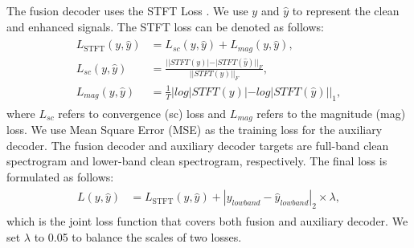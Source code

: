 The fusion decoder uses the STFT Loss \citep{defossez2020real}. We use $y$ and $\hat{y}$ to represent the clean and enhanced signals. The STFT loss can be denoted as follows: 
\begin{align} 
\label{math:stft_loss}
\begin{split}
    L_{\mathrm{STFT}}(y, \hat{y}) &= L_{sc}(y, \hat{y}) + L_{mag}(y, \hat{y}),
    \\
    L_{sc}(y, \hat{y}) &= \frac{||STFT(y)| - |STFT(\hat{y})||_{F}}{||STFT(y)||_{F}},
    \\
    L_{mag}(y, \hat{y}) &= \frac{1}{T}|log|STFT(y)| - log|STFT(\hat{y})||_{1},
\end{split}
\end{align} 
where $L_{sc}$ refers to convergence
(sc) loss and $L_{mag}$ refers to the magnitude (mag) loss.
We use Mean Square Error (MSE) as the training loss for the auxiliary decoder. The fusion decoder and auxiliary decoder targets are full-band clean spectrogram and lower-band clean spectrogram, respectively. The final loss is formulated as follows: 
\begin{align} 
\label{math:overall_loss}
\begin{split}
    L(y, \hat{y}) &= L_{\mathrm{STFT}}(y, \hat{y}) + |y_{lowband} - \hat{y}_{lowband}|_{2} \times \lambda,
\end{split}
\end{align}
which is the joint loss function that covers both fusion and auxiliary decoder. We set $\lambda$ to 0.05 to balance the scales of two losses.

